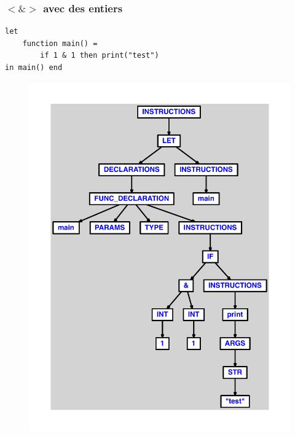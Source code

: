 \documentclass{article}
\begin{document}
\subsubsection{$ < $$ \& $$ > $ avec des entiers}
\begin{lstlisting}
let
	function main() =
		if 1 & 1 then print("test")
in main() end
\end{lstlisting}
\newpage
\begin{figure}[H]
\centering
\includegraphics[max width=\textwidth]{ast/ast_5.pdf}
\end{figure}
\newpage
\end{document}
